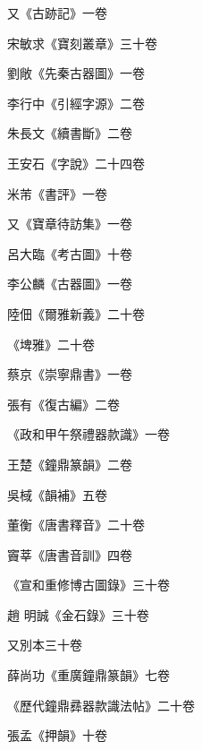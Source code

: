 \begin{pinyinscope}
 又《古跡記》一卷



 宋敏求《寶刻叢章》三十卷



 劉敞《先秦古器圖》一卷



 李行中《引經字源》二卷



 朱長文《續書斷》二卷



 王安石《字說》二十四卷



 米芾《書評》一卷



 又《寶章待訪集》一卷



 呂大臨《考古圖》十卷



 李公麟《古器圖》一卷



 陸佃《爾雅新義》二十卷



 《埤雅》二十卷



 蔡京《崇寧鼎書》一卷



 張有《復古編》二卷



 《政和甲午祭禮器款識》一卷



 王楚《鐘鼎篆韻》二卷



 吳棫《韻補》五卷



 董衡《唐書釋音》二十卷



 竇莘《唐書音訓》四卷



 《宣和重修博古圖錄》三十卷



 趙
 明誠《金石錄》三十卷



 又別本三十卷



 薛尚功《重廣鐘鼎篆韻》七卷



 《歷代鐘鼎彞器款識法帖》二十卷



 張孟《押韻》十卷




\end{pinyinscope}
